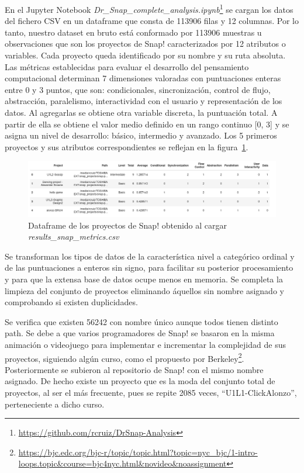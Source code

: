 \documentclass[a4paper, 12pt]{book}
\begin{document}
En el Jupyter Notebook \emph{ Dr\_Snap\_complete\_analysis.ipynb}\footnote{\url{https://github.com/rcruiz/DrSnap-Analysis}} se cargan los datos del fichero CSV en un dataframe que consta de 113906 filas y 12 columnas. Por lo tanto, nuestro dataset en bruto está conformado por 113906 muestras u observaciones que son los proyectos de Snap! caracterizados por 12 atributos o variables. Cada proyecto queda identificado por su nombre y su ruta absoluta. 
Las métricas establecidas para evaluar el desarrollo del pensamiento computacional determinan 7 dimensiones valoradas con puntuaciones enteras entre 0 y 3 puntos, que son: condicionales, sincronización, control de flujo, abstracción, paralelismo, interactividad con el usuario y representación de los datos. Al agregarlas se obtiene otra variable discreta, la puntuación total. A partir de ella se obtiene el valor medio definido en un rango continuo [0, 3] y se asigna un nivel de desarrollo: básico, intermedio y avanzado. Los 5 primeros proyectos y sus atributos correspondientes se reflejan en la figura~\ref{fig:df_Snap}.

\begin{figure}[H]
    \centering
    \includegraphics[width=1.0\textwidth]{img/df_origen_Snap.png}
    \caption{Dataframe de los proyectos de Snap! obtenido al cargar \emph{results\_snap\_metrics.csv}}
    \label{fig:df_Snap}
\end{figure}

Se transforman los tipos de datos de la característica nivel a categórico ordinal y de las puntuaciones a enteros sin signo, para facilitar su posterior procesamiento y para que la extensa base de datos ocupe menos en memoria. Se completa la limpieza del conjunto de proyectos eliminando áquellos sin nombre asignado y comprobando si existen duplicidades.

Se verifica que existen 56242 con nombre único aunque todos tienen distinto path. Se debe a que varios programadores de Snap! se basaron en la misma animación o videojuego para implementar e incrementar la complejidad de sus proyectos, siguiendo algún curso, como el propuesto por Berkeley\footnote{\url{https://bjc.edc.org/bjc-r/topic/topic.html?topic=nyc_bjc/1-intro-loops.topic&course=bjc4nyc.html&novideo&noassignment}}. Posteriormente se subieron al repositorio de Snap! con el mismo nombre asignado. De hecho existe un proyecto que es la moda del conjunto total de proyectos, al ser el más frecuente, pues se repite 2085 veces, ``U1L1-ClickAlonzo'', perteneciente a dicho curso.
\end{document}
